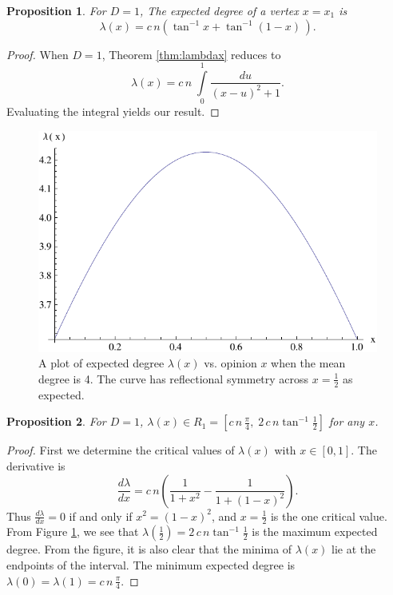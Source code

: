 \documentclass[a4paper,10pt]{article}
\newtheorem{prop}{Proposition}
\begin{document}
\begin{prop}
For $D = 1$, The expected degree of a vertex $x = x_1$ is
 \begin{equation}
 \lambda(x) = c\,n\left(\tan^{-1} x + \tan^{-1} (1-x)\,\right).
\end{equation}
\end{prop}
\begin{proof}
When $D=1$, Theorem \ref{thm:lambdax} reduces to
\begin{equation}
 \lambda(x) = c\,n\;\int\limits_{0}^{1} \frac{du}{(x - u)^2 + 1}.
\end{equation}
Evaluating the integral yields our result.
\end{proof}

\begin{figure}
 \centering
 \includegraphics{images/lambdaofx.pdf}
 \caption{A plot of expected degree $\lambda(x)$ vs. opinion $x$ when the mean degree is 4. The curve has reflectional symmetry across $x = \frac{1}{2}$ as expected.}
 \label{fig:lambdaofx}
\end{figure}

\begin{prop}
\label{prop:R1}
 For $D=1$, $\lambda(x) \in R_1 = [c\,n\,\frac{\pi}{4},\; 2\,c\,n \tan^{-1}\frac{1}{2}]$ for any $x$.
 \end{prop}
\begin{proof}
First we determine the critical values of $\lambda(x)$ with $x \in [0, 1]$. The derivative is
\begin{equation}
 \frac{d\lambda}{dx} = c\,n\left(\frac{1}{1+x^2} - \frac{1}{1+(1-x)^2} \right).
\end{equation}
Thus $\frac{d\lambda}{dx} = 0$ if and only if $x^2 = (1 - x)^2$, and $x=\frac{1}{2}$ is the one critical value. From Figure \ref{fig:lambdaofx}, we see that $\lambda(\frac{1}{2}) = 2\,c\,n \tan^{-1}\frac{1}{2}$ is the maximum expected degree. From the figure, it is also clear that the minima of $\lambda(x)$ lie at the endpoints of the interval. The minimum expected degree is $\lambda(0) = \lambda(1) = c\,n\,\frac{\pi}{4}.$
\end{proof}
\end{document}
